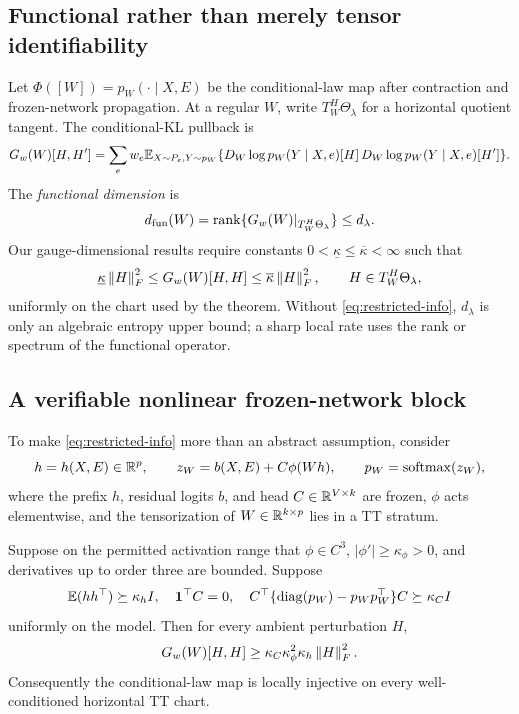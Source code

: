 \subsection{Functional rather than merely tensor identifiability}

Let \(\Phi([W])=p_W(\cdot\mid X,E)\) be the conditional-law map after contraction and frozen-network propagation. At a regular \(W\), write \(T_W^H\Theta_\lambda\) for a horizontal quotient tangent. The conditional-KL pullback is
\begin{equation}
G_w(W)[H,H']
=\sum_e w_e\mathbb E_{X\sim P_e,Y\sim p_W}
\{D_W\log p_W(Y\mid X,e)[H]\,
  D_W\log p_W(Y\mid X,e)[H']\}.
\label{eq:functional-metric}
\end{equation}
The \emph{functional dimension} is
\[
d_{\mathrm{fun}}(W)=\operatorname{rank}\{G_w(W)|_{T_W^H\Theta_\lambda}\}\le d_\lambda.
\]
Our gauge-dimensional results require constants \(0<\underline\kappa\le\overline\kappa<\infty\) such that
\begin{equation}
 \underline\kappa\left\lVert H\right\rVert_F^2
 \le G_w(W)[H,H]
 \le\overline\kappa\left\lVert H\right\rVert_F^2,
 \qquad H\in T_W^H\Theta_\lambda,
\label{eq:restricted-info}
\end{equation}
uniformly on the chart used by the theorem. Without \cref{eq:restricted-info}, \(d_\lambda\) is only an algebraic entropy upper bound; a sharp local rate uses the rank or spectrum of the functional operator.

\subsection{A verifiable nonlinear frozen-network block}

To make \cref{eq:restricted-info} more than an abstract assumption, consider
\begin{equation}
h=h(X,E)\in\mathbb R^p,\qquad
z_W=b(X,E)+C\phi(Wh),\qquad
p_W=\operatorname{softmax}(z_W),
\label{eq:nonlinear-block}
\end{equation}
where the prefix \(h\), residual logits \(b\), and head \(C\in\mathbb R^{V\times k}\) are frozen, \(\phi\) acts elementwise, and the tensorization of \(W\in\mathbb R^{k\times p}\) lies in a TT stratum.

\begin{proposition}
\label{prop:block-curvature}
Suppose on the permitted activation range that \(\phi\in C^3\), \(|\phi'|\ge\kappa_\phi>0\), and derivatives up to order three are bounded. Suppose
\[
\mathbb E(hh^\top)\succeq\kappa_h I,
\quad \bm 1^\top C=0,
\quad
C^\top\{\operatorname{diag}(p_W)-p_Wp_W^\top\}C\succeq\kappa_C I
\]
uniformly on the model. Then for every ambient perturbation \(H\),
\[
G_w(W)[H,H]\ge
\kappa_C\kappa_\phi^2\kappa_h\left\lVert H\right\rVert_F^2.
\]
Consequently the conditional-law map is locally injective on every well-conditioned horizontal TT chart.
\end{proposition}

